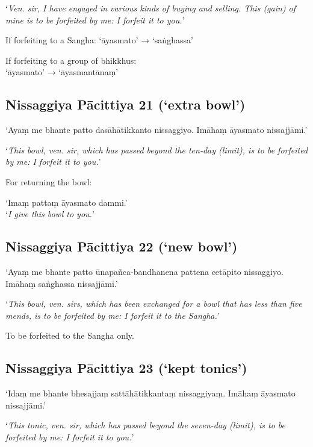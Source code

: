 ‘\emph{Ven. sir, I have engaged in various kinds of buying and selling. This
  (gain) of mine is to be forfeited by me: I forfeit it to you.}’ 

If forfeiting to a Sangha: ‘āyasmato’ → ‘saṅghassa’

If forfeiting to a group of bhikkhus:\\
‘āyasmato’ → ‘āyasmantānaṃ’


\subsection{Nissaggiya Pācittiya 21 (‘extra bowl’)}

‘Ayaṃ me bhante patto dasāhātikkanto nissaggiyo. Imāhaṃ āyasmato nissajjāmi.’

‘\emph{This bowl, ven. sir, which has passed beyond the ten-day (limit), is to be
  forfeited by me: I forfeit it to you.}’


For returning the bowl:

‘Imaṃ pattaṃ āyasmato dammi.’\\
‘\emph{I give this bowl to you.}’ 

\subsection{Nissaggiya Pācittiya 22 (‘new bowl’)}

‘Ayaṃ me bhante patto ūnapañca-bandhanena pattena cetāpito nissaggiyo. Imāhaṃ
saṅghassa nissajjāmi.’

‘\emph{This bowl, ven. sirs, which has been exchanged for a bowl that has less
  than five mends, is to be forfeited by me: I forfeit it to the Sangha.}’

To be forfeited to the Sangha only. 

\subsection{Nissaggiya Pācittiya 23 (‘kept tonics’)}

‘Idaṃ me bhante bhesajjaṃ sattāhātikkantaṃ nissaggiyaṃ. Imāhaṃ āyasmato
nissajjāmi.’

‘\emph{This tonic, ven. sir, which has passed beyond the seven-day
  (limit), is to be forfeited by me: I forfeit it to you.}’

